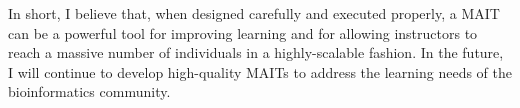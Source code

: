 In short, I believe that, when designed carefully and executed properly, a \gls{MAIT} can be a powerful tool for improving learning and for allowing instructors to reach a massive number of individuals in a highly-scalable fashion. In the future, I will continue to develop high-quality \glspl{MAIT} to address the learning needs of the bioinformatics community.

